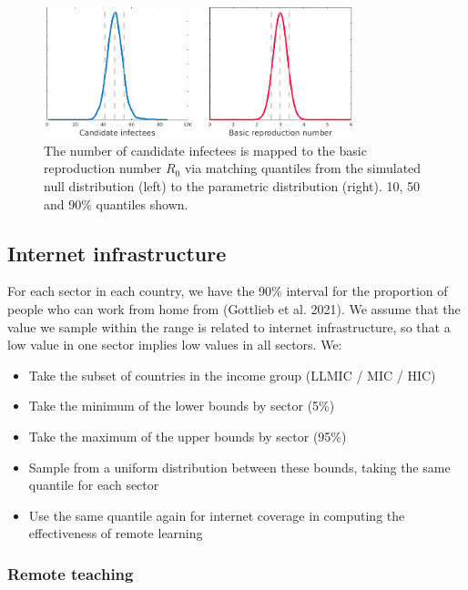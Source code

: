\documentclass[
]{article}
\providecommand{\tightlist}{%
  \setlength{\itemsep}{0pt}\setlength{\parskip}{0pt}}
\begin{document}
\begin{figure}
\centering
\includegraphics[width=0.8\textwidth,height=\textheight]{candidateinfectees.png}
\caption{\label{fig:candidateinfectees} The number of candidate infectees is mapped to the basic reproduction number \(R_0\) via matching quantiles from the simulated null distribution (left) to the parametric distribution (right). 10, 50 and 90\% quantiles shown.}
\end{figure}

\newpage

\hypertarget{internet-infrastructure}{%
\subsection{Internet infrastructure}\label{internet-infrastructure}}

For each sector in each country, we have the 90\% interval for the proportion of people who can work from home from (Gottlieb et al. 2021). We assume that the value we sample within the range is related to internet infrastructure, so that a low value in one sector implies low values in all sectors. We:

\begin{itemize}
\tightlist
\item
  Take the subset of countries in the income group (LLMIC / MIC / HIC)
\item
  Take the minimum of the lower bounds by sector (5\%)
\item
  Take the maximum of the upper bounds by sector (95\%)
\item
  Sample from a uniform distribution between these bounds, taking the same quantile for each sector
\item
  Use the same quantile again for internet coverage in computing the effectiveness of remote learning
\end{itemize}

\hypertarget{remote-teaching}{%
\subsubsection{Remote teaching}\label{remote-teaching}}
\end{document}
